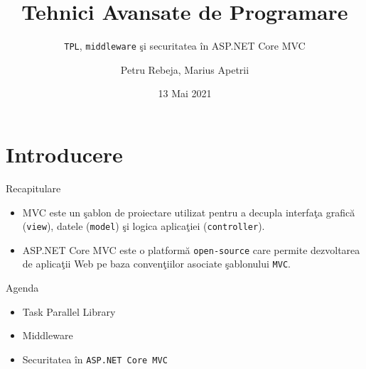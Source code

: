 \documentclass[presentation]{beamer}
\author{Petru Rebeja, Marius Apetrii}
\date{13 Mai 2021}
\title{Tehnici Avansate de Programare}
\subtitle{\texttt{TPL}, \texttt{middleware} şi securitatea în ASP.NET Core MVC}
\institute[UAIC]{Facultatea de Matematică\\Universitatea Alexandru Ioan Cuza, Iași}
\begin{document}
\maketitle
\section{Introducere}
\label{sec:orgadd0e02}
\begin{frame}[label={sec:org0733dad},fragile]{Recapitulare}
 \pause
\begin{itemize}
\item \alert{MVC} este un şablon de proiectare utilizat pentru a decupla interfaţa grafică (\texttt{view}), datele (\texttt{model}) şi logica aplicaţiei (\texttt{controller}).
\end{itemize}
\pause
\begin{itemize}
\item \alert{ASP.NET Core MVC} este o platformă \texttt{open-source} care permite dezvoltarea de aplicaţii Web pe baza convenţiilor asociate şablonului \texttt{MVC}.
\end{itemize}
\end{frame}
\begin{frame}[label={sec:org491c8d4},fragile]{Agenda}
 \begin{itemize}
\item Task Parallel Library
\item Middleware
\item Securitatea în \texttt{ASP.NET Core MVC}
\end{itemize}
\end{frame}
\end{document}
